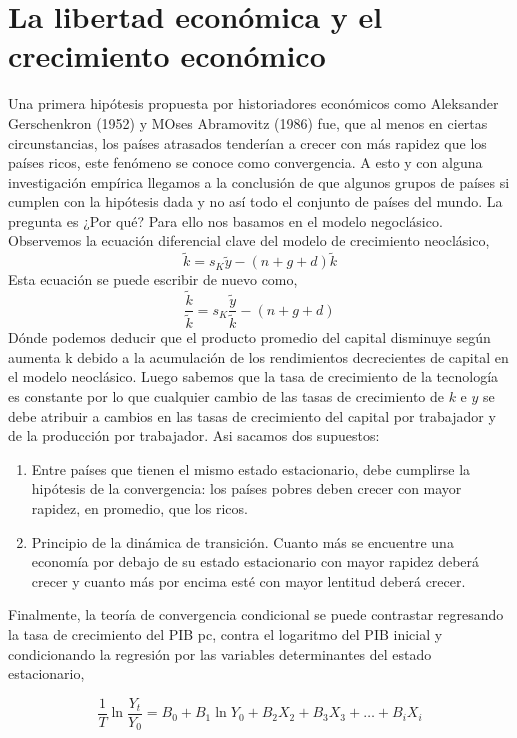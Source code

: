 \section*{La libertad económica y el crecimiento económico}
Una primera hipótesis propuesta por historiadores económicos como Aleksander Gerschenkron (1952) y MOses Abramovitz (1986) fue, que al menos en ciertas circunstancias, los países atrasados tenderían a crecer con más rapidez que los países ricos, este fenómeno se conoce como convergencia. A esto y con alguna investigación empírica llegamos a la conclusión de que algunos grupos de países si cumplen con la hipótesis dada y no así todo el conjunto de países del mundo. La pregunta es ¿Por qué? Para ello nos basamos en el modelo negoclásico.\\
Observemos la ecuación diferencial clave del modelo de crecimiento neoclásico,
$$\tilde{k}=s_K \tilde{y}-(n+g+d)\tilde{k}$$
Esta ecuación se puede escribir de nuevo como,
$$\dfrac{\tilde{k}}{\tilde{k}}=s_K \dfrac{\tilde{y}}{\tilde{k}}-(n+g+d)$$
Dónde podemos deducir que el producto promedio del capital disminuye según aumenta k debido a la acumulación de los rendimientos decrecientes de capital en el modelo neoclásico. Luego sabemos que la tasa de crecimiento de la tecnología es constante por lo que cualquier cambio de las tasas de crecimiento de $k$ e $y$ se debe atribuir a cambios en las tasas de crecimiento del capital por trabajador y de la producción por trabajador. Asi sacamos dos supuestos:
\begin{enumerate}
    \item Entre países que tienen el mismo estado estacionario, debe cumplirse la hipótesis de la convergencia: los países pobres deben crecer con mayor rapidez, en promedio, que los ricos.
    \item Principio de la dinámica de transición. Cuanto más se encuentre una economía por debajo de su estado estacionario con mayor rapidez deberá crecer y cuanto más por encima esté con mayor lentitud deberá crecer.
\end{enumerate}
Finalmente, la teoría de convergencia condicional se puede contrastar regresando la tasa de crecimiento del PIB pc, contra el logaritmo del PIB inicial y condicionando la regresión por las variables determinantes del estado estacionario,

$$\dfrac{1}{T}\ln\dfrac{Y_t}{Y_0}=B_0+B_1\ln Y_0 + B_2 X_2 + B_3 X_3 + \ldots + B_i X_i$$


